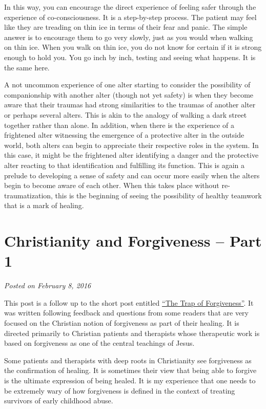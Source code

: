 \documentclass[]{book}
\begin{document}
In this way, you can encourage the direct experience of feeling safer through the experience of co-consciousness. It is a step-by-step process. The patient may feel like they are treading on thin ice in terms of their fear and panic. The simple answer is to encourage them to go very slowly, just as you would when walking on thin ice. When you walk on thin ice, you do not know for certain if it is strong enough to hold you. You go inch by inch, testing and seeing what happens. It is the same here.

A not uncommon experience of one alter starting to consider the possibility of companionship with another alter (though not yet safety) is when they become aware that their traumas had strong similarities to the traumas of another alter or perhaps several alters. This is akin to the analogy of walking a dark street together rather than alone. In addition, when there is the experience of a frightened alter witnessing the emergence of a protective alter in the outside world, both alters can begin to appreciate their respective roles in the system. In this case, it might be the frightened alter identifying a danger and the protective alter reacting to that identification and fulfilling its function. This is again a prelude to developing a sense of safety and can occur more easily when the alters begin to become aware of each other. When this takes place without re-traumatization, this is the beginning of seeing the possibility of healthy teamwork that is a mark of healing.

\hypertarget{christianity-and-forgiveness-part-1}{%
\section{Christianity and Forgiveness -- Part 1}\label{christianity-and-forgiveness-part-1}}

\emph{Posted on February 8, 2016}

This post is a follow up to the short post entitled \href{https://www.engagingmultiples.com/trap-forgiveness/}{``The Trap of Forgiveness''}. It was written following feedback and questions from some readers that are very focused on the Christian notion of forgiveness as part of their healing. It is directed primarily to Christian patients and therapists whose therapeutic work is based on forgiveness as one of the central teachings of Jesus.

Some patients and therapists with deep roots in Christianity see forgiveness as the confirmation of healing. It is sometimes their view that being able to forgive is the ultimate expression of being healed. It is my experience that one needs to be extremely wary of how forgiveness is defined in the context of treating survivors of early childhood abuse.
\end{document}
